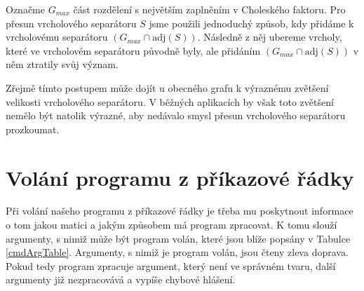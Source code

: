 \documentclass{ctuthesis}
\theoremstyle{plain}
\theoremstyle{definition}
\begin{document}
Označme $G_{max}$ část rozdělení s největším zaplněním v Choleského faktoru. Pro přesun vrcholového separátoru $S$ jsme použili jednoduchý způsob, kdy přidáme k vrcholovému separátoru $(G_{max} \cap\mathrm{adj}(S))$. Následně z něj ubereme vrcholy, které ve vrcholovém separátoru původně byly, ale přidáním $(G_{max} \cap\mathrm{adj}(S))$ v něm ztratily svůj význam.

Zřejmě tímto postupem může dojít u obecného grafu k výraznému zvětšení velikosti vrcholového separátoru. V běžných aplikacích by však toto zvětšení nemělo být natolik výrazné, aby nedávalo smysl přesun vrcholového separátoru prozkoumat.


\section{Volání programu z příkazové řádky}
\label{cmdlineSection}

Při volání našeho programu z příkazové řádky je třeba mu poskytnout informace o tom jakou matici a jakým způsobem má program zpracovat. K tomu slouží argumenty, s nimiž může být program volán, které jsou blíže popsány v Tabulce \ref{cmdArgTable}. Argumenty, s nimiž je program volán, jsou čteny zleva doprava. Pokud tedy program zpracuje argument, který není ve správném tvaru, další argumenty již nezpracovává a vypíše chybové hlášení.
\end{document}
